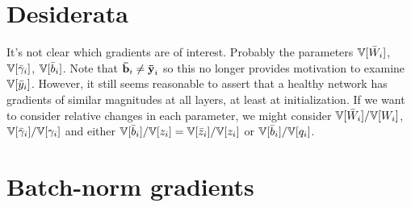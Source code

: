 \section{Desiderata}

It's not clear which gradients are of interest.
Probably the parameters $\mathbb{V}[\bar{W}_{i}]$,  $\mathbb{V}[\bar{\gamma}_{i}]$,  $\mathbb{V}[\bar{b}_{i}]$.
Note that $\boldsymbol{\mathbf{\bar{b}}}_{i} \ne \boldsymbol{\mathbf{\bar{y}}}_{i}$ so this no longer provides motivation to examine $\mathbb{V}[\bar{y}_{i}]$.
However, it still seems reasonable to assert that a healthy network has gradients of similar magnitudes at all layers, at least at initialization.
If we want to consider relative changes in each parameter, we might consider $\mathbb{V}[\bar{W}_{i}] / \mathbb{V}[W_{i}]$,  $\mathbb{V}[\bar{\gamma}_{i}] / \mathbb{V}[\gamma_{i}]$ and either $\mathbb{V}[\bar{b}_{i}] / \mathbb{V}[z_{i}] = \mathbb{V}[\bar{z}_{i}] / \mathbb{V}[z_{i}]$ or $\mathbb{V}[\bar{b}_{i}] / \mathbb{V}[q_{i}]$.


\section{Batch-norm gradients}

